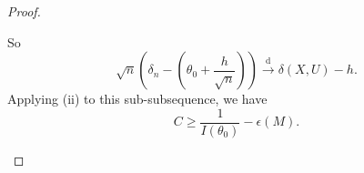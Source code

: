 \documentclass[a4paper]{article}
\begin{document}
\begin{proof}
\begin{enumerate}[leftmargin=*]
\begin{equation*}
		\end{equation*}
		So
		\begin{equation*}
			\sqrt{n} \left(\delta_n - \left(\theta_0 + \frac{h}{\sqrt{n}}\right)\right) \stackrel{\text{d}}{\longrightarrow} \delta(X,U) - h.
		\end{equation*}
		Applying (ii) to this sub-subsequence, we have
		\begin{equation*}
			C \geq \frac{1}{I(\theta_0)} - \epsilon(M).
		\end{equation*}
	\end{enumerate}	
\end{proof}

\printindex
\end{document}
